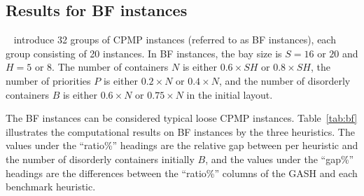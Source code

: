 \documentclass[review,3p,times,12pt,number]{elsarticle}\usepackage{amsmath}\usepackage{amssymb}
\renewcommand{\citet}[1]{\citeauthor{#1}~\citep{#1}}
\begin{document}
\subsection{Results for BF instances}

\citet{bort2012} introduce 32 groups of CPMP instances (referred to as BF instances), each group consisting of 20 instances. In BF instances, the bay size is $S=16$ or $20$ and $H=5$ or $8$. The number of containers $N$ is either $0.6\times SH$ or $0.8\times SH$, the number of priorities $P$ is either $0.2\times N$ or $0.4\times N$, and the number of disorderly containers  $B$ is either $0.6\times N$ or $0.75\times N$ in the initial layout.

The BF instances can be considered typical loose CPMP instances. Table~\ref{tab:bf} illustrates the computational results on BF instances by the three heuristics. The values under the ``ratio\%'' headings are the relative gap between per heuristic and the number of disorderly containers initially $B$, and the values under the ``gap\%'' headings are the differences between the ``ratio\%'' columns of the GASH and each benchmark heuristic.
\end{document}

